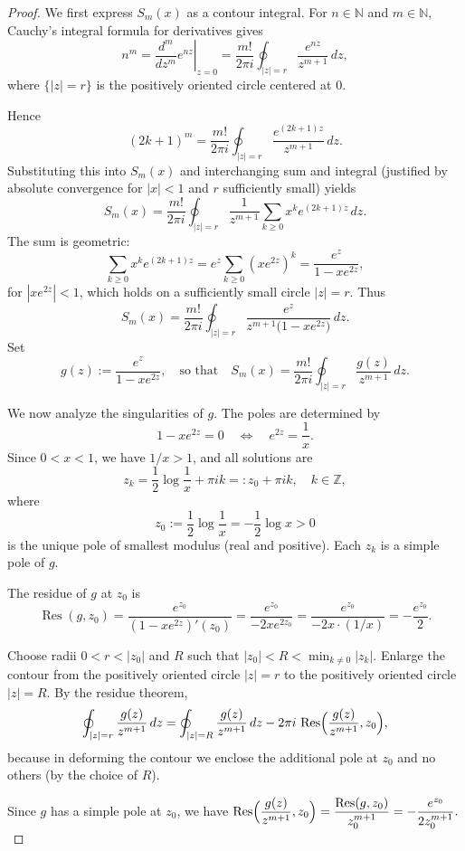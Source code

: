 \documentclass[10pt,a4paper]{amsart}
\begin{document}
\begin{proof}
We first express $S_m(x)$ as a contour integral. For $n\in\mathbb{N}$ and $m\in\mathbb{N}$, Cauchy’s integral formula for derivatives gives
\[
n^m
= \left.\frac{d^m}{dz^m} e^{nz}\right|_{z=0}
= \frac{m!}{2\pi i} \oint_{|z|=r} \frac{e^{nz}}{z^{m+1}}\,dz,
\]
where $\{|z|=r\}$ is the positively oriented circle centered at $0$.

Hence
\[
(2k+1)^m
= \frac{m!}{2\pi i} \oint_{|z|=r} \frac{e^{(2k+1)z}}{z^{m+1}}\,dz.
\]
Substituting this into $S_m(x)$ and interchanging sum and integral (justified by absolute convergence for $|x|<1$ and $r$ sufficiently small) yields
\[
S_m(x)
= \frac{m!}{2\pi i} \oint_{|z|=r} \frac{1}{z^{m+1}}
   \sum_{k\ge 0} x^k e^{(2k+1)z}\,dz.
\]
The sum is geometric:
\[
\sum_{k\ge 0} x^k e^{(2k+1)z}
= e^z \sum_{k\ge 0} (x e^{2z})^k
= \frac{e^z}{1 - x e^{2z}},
\]
for $|x e^{2z}|<1$, which holds on a sufficiently small circle $|z|=r$. Thus
\[
S_m(x)
= \frac{m!}{2\pi i} \oint_{|z|=r}
  \frac{e^z}{z^{m+1} \bigl(1-x e^{2z}\bigr)}\,dz.
\]
Set
\[
g(z) := \frac{e^z}{1 - x e^{2z}},
\quad\text{so that}\quad
S_m(x) = \frac{m!}{2\pi i} \oint_{|z|=r} \frac{g(z)}{z^{m+1}}\,dz.
\]

We now analyze the singularities of $g$. The poles are determined by
\[
1 - x e^{2z} = 0
\quad\Longleftrightarrow\quad
e^{2z} = \frac{1}{x}.
\]
Since $0<x<1$, we have $1/x>1$, and all solutions are
\[
z_k = \frac{1}{2}\log\frac{1}{x} + \pi i k
    =: z_0 + \pi i k,\quad k\in\mathbb{Z},
\]
where
\[
z_0 := \frac{1}{2}\log\frac{1}{x} = -\frac{1}{2}\log x > 0
\]
is the unique pole of smallest modulus (real and positive). Each $z_k$ is a simple pole of $g$.

The residue of $g$ at $z_0$ is
\[
\operatorname{Res}(g,z_0)
= \frac{e^{z_0}}{(1 - x e^{2z})'(z_0)}
= \frac{e^{z_0}}{-2x e^{2z_0}}
= \frac{e^{z_0}}{-2x\cdot (1/x)}
= -\frac{e^{z_0}}{2}.
\]

Choose radii $0<r<|z_0|$ and $R$ such that
\(\displaystyle
|z_0| < R < \min_{k\ne 0} |z_k|.
\)
Enlarge the contour from the positively oriented circle $|z|=r$ to the positively oriented circle $|z|=R$. By the residue theorem,
\[
\oint_{|z|=r}\frac{g(z)}{z^{m+1}}\,dz
= \oint_{|z|=R}\frac{g(z)}{z^{m+1}}\,dz
  - 2\pi i\,\operatorname{Res}\Bigl(\frac{g(z)}{z^{m+1}}, z_0\Bigr),
\]
because in deforming the contour we enclose the additional pole at $z_0$ and no others (by the choice of $R$).

Since $g$ has a simple pole at $z_0$, we have
\(\displaystyle
\operatorname{Res}\Bigl(\frac{g(z)}{z^{m+1}}, z_0\Bigr)
= \frac{\operatorname{Res}(g,z_0)}{z_0^{m+1}}
= -\frac{e^{z_0}}{2 z_0^{m+1}}.
\)


\end{proof}
\end{document}
